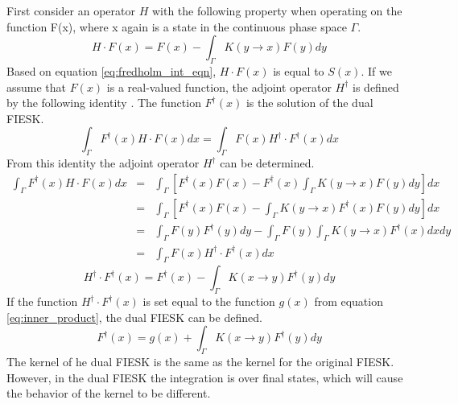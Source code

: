 First consider an operator $H$ with the following property when operating
on the function F(x), where x again is a state in the continuous phase space
$\Gamma$. 
\begin{equation}
  H \cdot F(x) = F(x) - \int_{\Gamma} K(y \to x)F(y)dy
  \label{eq:forward_operator}
\end{equation}
Based on equation \ref{eq:fredholm_int_eqn}, $H \cdot F(x)$ is equal to $S(x)$.
If we assume that $F(x)$ is a real-valued function, the adjoint operator 
$H^{\dagger}$ is defined by the following identity 
\citep{morse_methods_1953}. The function $F^{\dagger}(x)$ is the solution 
of the dual FIESK. 
\begin{equation}
  \int_{\Gamma}F^{\dagger}(x)H \cdot F(x)dx  = 
  \int_{\Gamma}F(x)H^{\dagger} \cdot F^{\dagger}(x)dx
  \label{eq:forward_adjoint_ops}
\end{equation}
From this identity the adjoint operator $H^{\dagger}$ can be determined.
\begin{eqnarray}
  \int_{\Gamma} F^{\dagger}(x)H \cdot F(x)dx & = & \int_{\Gamma} 
  \left[F^{\dagger}(x)F(x) -
  F^{\dagger}(x)\int_{\Gamma}K(y \to x)F(y)dy \right]dx \nonumber \\
  & = & \int_{\Gamma} \left[F^{\dagger}(x)F(x) -
  \int_{\Gamma}K(y \to x)F^{\dagger}(x)F(y)dy \right]dx \nonumber \\
  & = & \int_{\Gamma} F(y)F^{\dagger}(y)dy - 
  \int_{\Gamma}F(y)\int_{\Gamma}K(y \to x)F^{\dagger}(x)dxdy \nonumber \\
  & = & \int_{\Gamma}F(x)H^{\dagger} \cdot F^{\dagger}(x)dx \nonumber
\end{eqnarray}
\begin{equation}
  H^{\dagger} \cdot F^{\dagger}(x) = F^{\dagger}(x) - 
  \int_{\Gamma}K(x \to y)F^{\dagger}(y)dy
  \label{eq:adjoint_operator}
\end{equation}
If the function $H^{\dagger} \cdot F^{\dagger}(x)$ is set equal to the function
$g(x)$ from equation \ref{eq:inner_product}, the dual FIESK can be defined.
\begin{equation}
  F^{\dagger}(x) = g(x) + \int_{\Gamma}K(x \to y)F^{\dagger}(y)dy 
  \label{eq:dual_fredholm_int_eqn}
\end{equation}
The kernel of he dual FIESK is the same as the kernel for the original FIESK. 
However, in the dual FIESK the integration is over final states, which will 
cause the behavior of the kernel to be different.

